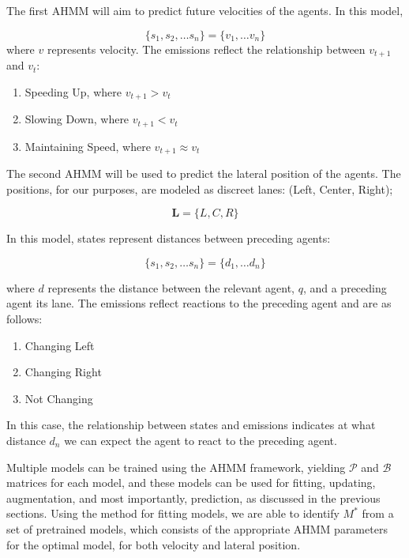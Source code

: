 \documentclass[conference]{IEEEtran}
\begin{document}
The first AHMM will aim to predict future velocities of the agents. In this model,

\begin{equation}
\{s_1,s_2,\ldots s_n\} = \{v_1,\ldots v_n\}
\end{equation}
    where $v$ represents velocity. The emissions reflect the relationship between $v_{t+1}$ and $v_t$:

\begin{enumerate}
    \item Speeding Up, where $v_{t+1} > v_t$
    \item Slowing Down, where $v_{t+1} < v_t$
    \item Maintaining Speed, where $v_{t+1} \approx v_t$
\end{enumerate}

The second AHMM will be used to predict the lateral position of the agents. The positions, for our purposes, are modeled as discreet lanes: (Left, Center, Right);

\begin{equation}
    \mathbf{L} = \{L,C,R\}
\end{equation}

In this model, states represent distances between preceding agents:

\begin{equation}
\{s_1,s_2,\ldots s_n\} = \{d_1,\ldots d_n\}
\end{equation}

where $d$ represents the distance between the relevant agent, $q$, and a preceding agent its lane. The emissions reflect reactions to the preceding agent and are as follows:
\begin{enumerate}
    \item Changing Left
    \item Changing Right
    \item Not Changing
\end{enumerate}
In this case, the relationship between states and emissions indicates at what distance $d_n$ we can expect the agent to react to the preceding agent.

Multiple models can be trained using the AHMM framework, yielding $\mathcal{P}$ and $\mathcal{B}$ matrices for each model, and these models can be used for fitting, updating, augmentation, and most importantly, prediction, as discussed in the previous sections. Using the method for fitting models, we are able to identify $M^*$ from a set of pretrained models, which consists of the appropriate AHMM parameters for the optimal model, for both velocity and lateral position.
\end{document}
